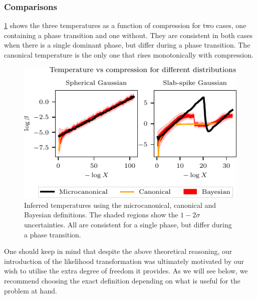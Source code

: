 \documentclass[usenatbib]{mnras}
\begin{document}
\subsubsection*{Comparisons}
\cref{fig:beta_comparison} shows the three temperatures as a function of compression for two cases, one containing a phase transition and one without. They are consistent in both cases when there is a single dominant phase, but differ during a phase transition. The canonical temperature is the only one that rises monotonically with compression.
\begin{figure}
\begin{center}
    \includegraphics{figures/beta_comparison.pdf}
\end{center}
\caption{Inferred temperatures using the microcanonical, canonical and Bayesian definitions. The shaded regions show the $1-2\sigma$ uncertainties. All are consistent for a single phase, but differ during a phase transition.}
\label{fig:beta_comparison}
\end{figure}
\par
One should keep in mind that despite the above theoretical reasoning, our introduction of the likelihood transformation was ultimately motivated by our wish to utilise the extra degree of freedom it provides. As we will see below, we recommend choosing the exact definition depending on what is useful for the problem at hand.
\end{document}
